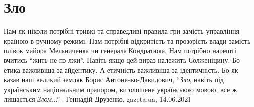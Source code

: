 
 
 
 
 
\chapter{Зло}
\label{sec:slova.zlo}

Нам як ніколи потрібні тривкі та справедливі правила гри замість управління
країною в ручному режимі. Нам потрібні відкритість та прозорість влади замість
плівок майора Мельниченка чи генерала Кондратюка. Нам потрібно нарешті вчитись
\enquote{жить не по лжи}. Навіть якщо цей вираз належить Солженіцину. Бо етика
важливіша за айдентику. А етичність важливіша за ідентичність. Бо як казав наш
великий земляк Борис Антоненко-Давидович, \enquote{\emph{Зло}, навіть під українським
національним прапором, виголошене українською мовою, все ж лишається \emph{Злом}...}
, 
Геннадій Друзенко, gazeta.ua, 14.06.2021

